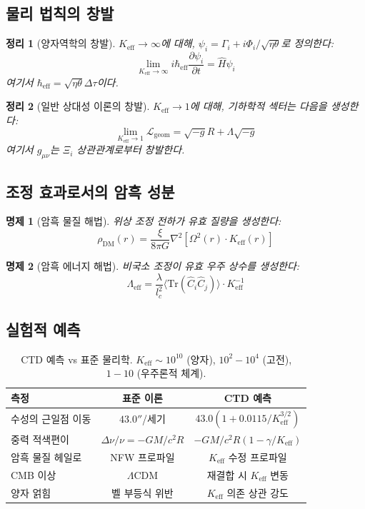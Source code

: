 \documentclass[11pt,a4paper]{article}
\newtheorem{theorem}{정리}
\newtheorem{proposition}{명제}
\begin{document}
	\subsection{물리 법칙의 창발}
	
	\begin{theorem}[양자역학의 창발]
		$K_{\mathrm{eff}} \to \infty$에 대해, $\psi_i = \Gamma_i + i\Phi_i/\sqrt{\eta\theta}$로 정의한다:
		\[
		\lim_{K_{\mathrm{eff}} \to \infty} i\hbar_{\mathrm{eff}}\frac{\partial\psi_i}{\partial t} = \hat{H}\psi_i
		\]
		여기서 $\hbar_{\mathrm{eff}} = \sqrt{\eta\theta}\Delta\tau$이다.
	\end{theorem}
	
	\begin{theorem}[일반 상대성 이론의 창발]
		$K_{\mathrm{eff}} \to 1$에 대해, 기하학적 섹터는 다음을 생성한다:
		\[
		\lim_{K_{\mathrm{eff}} \to 1} \mathcal{L}_{\mathrm{geom}} = \sqrt{-g}R + \Lambda\sqrt{-g}
		\]
		여기서 $g_{\mu\nu}$는 $\Xi_i$ 상관관계로부터 창발한다.
	\end{theorem}
	
	\subsection{조정 효과로서의 암흑 성분}
	
	\begin{proposition}[암흑 물질 해법]
		위상 조정 전하가 유효 질량을 생성한다:
		\[
		\rho_{\mathrm{DM}}(r) = \frac{\xi}{8\pi G} \nabla^2 \left[ \Omega^2(r) \cdot K_{\mathrm{eff}}(r) \right]
		\]
	\end{proposition}
	
	\begin{proposition}[암흑 에너지 해법]
		비국소 조정이 유효 우주 상수를 생성한다:
		\[
		\Lambda_{\mathrm{eff}} = \frac{\lambda}{l_c^2} \langle \mathrm{Tr}(\hat{C}_i\hat{C}_j) \rangle \cdot K_{\mathrm{eff}}^{-1}
		\]
	\end{proposition}
	
	\subsection{실험적 예측}
	
	\begin{table}[htbp]
		\centering
		\begin{tabular}{lcc}
			\toprule
			\textbf{측정} & \textbf{표준 이론} & \textbf{CTD 예측} \\
			\midrule
			수성의 근일점 이동 & $43.0''$/세기 & $43.0(1 + 0.0115/K_{\mathrm{eff}}^{3/2})$ \\
			중력 적색편이 & $\Delta\nu/\nu = -GM/c^2R$ & $-GM/c^2R(1 - \gamma/K_{\mathrm{eff}})$ \\
			암흑 물질 헤일로 & NFW 프로파일 & $K_{\mathrm{eff}}$ 수정 프로파일 \\
			CMB 이상 & $\Lambda$CDM & 재결합 시 $K_{\mathrm{eff}}$ 변동 \\
			양자 얽힘 & 벨 부등식 위반 & $K_{\mathrm{eff}}$ 의존 상관 강도 \\
			\bottomrule
		\end{tabular}
		\caption{CTD 예측 vs 표준 물리학. $K_{\mathrm{eff}} \sim 10^{10}$ (양자), $10^2-10^4$ (고전), $1-10$ (우주론적 체계).}
	\end{table}
	
\end{document}
